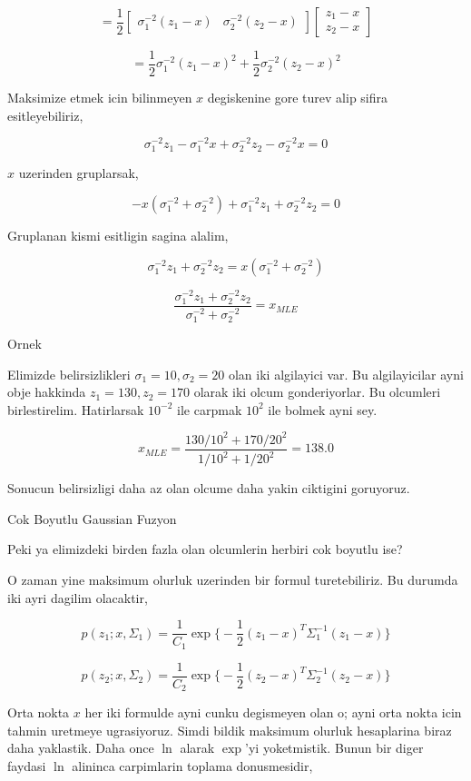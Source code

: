 \documentclass[12pt,fleqn]{article}\usepackage{../common}
\begin{document}
$$ = \frac{1}{2}  
\left[\begin{array}{cc}
\sigma_1^{-2}(z_1-x) & \sigma_2^{-2} (z_2-x)
\end{array}\right]
\left[\begin{array}{c}
z_1-x \\ z_2-x
\end{array}\right]
$$

$$ = 
\frac{1}{2}\sigma_1^{-2}(z_1-x)^2 + \frac{1}{2}\sigma_2^{-2} (z_2-x)^2
$$

Maksimize etmek icin bilinmeyen $x$ degiskenine gore turev alip sifira
esitleyebiliriz, 

$$ 
\sigma_1^{-2}z_1-\sigma_1^{-2}x + \sigma_2^{-2}z_2-\sigma_2^{-2}x = 0
$$

$x$ uzerinden gruplarsak,

$$ 
-x(\sigma_1^{-2}+\sigma_2^{-2}) + \sigma_1^{-2}z_1+ \sigma_2^{-2}z_2 = 0
$$

Gruplanan kismi esitligin sagina alalim,

$$ 
\sigma_1^{-2}z_1+ \sigma_2^{-2}z_2 = x(\sigma_1^{-2}+\sigma_2^{-2}) 
$$

$$ 
\frac{\sigma_1^{-2}z_1+ \sigma_2^{-2}z_2 }{\sigma_1^{-2}+\sigma_2^{-2}}= x_{MLE}
$$

Ornek

Elimizde belirsizlikleri $\sigma_1=10,\sigma_2=20$ olan iki algilayici
var. Bu algilayicilar ayni obje hakkinda $z_1=130,z_2=170$ olarak iki olcum
gonderiyorlar. Bu olcumleri birlestirelim. Hatirlarsak $10^{-2}$ ile
carpmak $10^{2}$ ile bolmek ayni sey.

$$ x_{MLE} =
\frac{130/10^2 + 170/20^2}{1/10^2 + 1/20^2} = 138.0
$$

Sonucun belirsizligi daha az olan olcume daha yakin ciktigini goruyoruz. 

Cok Boyutlu Gaussian Fuzyon

Peki ya elimizdeki birden fazla olan olcumlerin herbiri cok boyutlu ise? 

O zaman yine maksimum olurluk uzerinden bir formul turetebiliriz. Bu
durumda iki ayri dagilim olacaktir,

$$ p(z_1;x,\Sigma_1) =  \frac{ 1}{C_1} \exp 
\bigg\{ 
-\frac{ 1}{2}(z_1-x)^T\Sigma_1^{-1}(z_1-x)
\bigg\} $$

$$ p(z_2;x,\Sigma_2) =  \frac{ 1}{C_2} \exp 
\bigg\{ 
-\frac{ 1}{2}(z_2-x)^T\Sigma_2^{-1}(z_2-x)
\bigg\} $$

Orta nokta $x$ her iki formulde ayni cunku degismeyen olan o; ayni orta
nokta icin tahmin uretmeye ugrasiyoruz.  Simdi bildik maksimum olurluk
hesaplarina biraz daha yaklastik. Daha once $\ln$ alarak $\exp$'yi
yoketmistik. Bunun bir diger faydasi $\ln$ alininca carpimlarin toplama
donusmesidir, 
\end{document}
